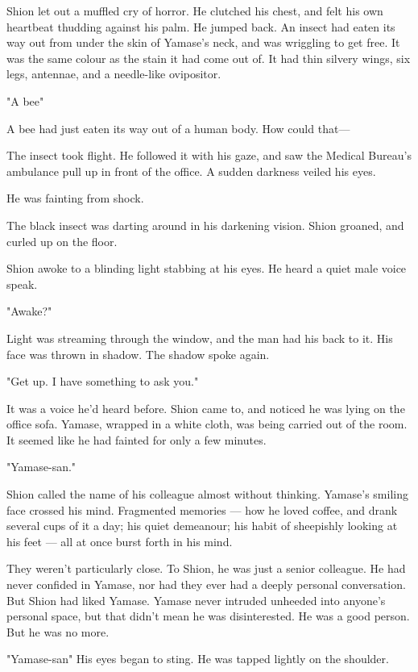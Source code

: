 Shion let out a muffled cry of horror. He clutched his chest, and felt
his own heartbeat thudding against his palm. He jumped back. An insect
had eaten its way out from under the skin of Yamase's neck, and was
wriggling to get free. It was the same colour as the stain it had come
out of. It had thin silvery wings, six legs, antennae, and a needle-like
ovipositor.

"A bee\el "

A bee had just eaten its way out of a human body. How could that---

The insect took flight. He followed it with his gaze, and saw the
Medical Bureau's ambulance pull up in front of the office. A sudden
darkness veiled his eyes.

He was fainting from shock.

The black insect was darting around in his darkening vision. Shion
groaned, and curled up on the floor.

\mybreak

Shion awoke to a blinding light stabbing at his eyes. He heard a quiet
male voice speak.

"Awake?"

Light was streaming through the window, and the man had his back to it.
His face was thrown in shadow. The shadow spoke again.

"Get up. I have something to ask you."

It was a voice he'd heard before. Shion came to, and noticed he was
lying on the office sofa. Yamase, wrapped in a white cloth, was being
carried out of the room. It seemed like he had fainted for only a few
minutes.

"Yamase-san."

Shion called the name of his colleague almost without thinking. Yamase's
smiling face crossed his mind. Fragmented memories --- how he loved
coffee, and drank several cups of it a day; his quiet demeanour; his
habit of sheepishly looking at his feet --- all at once burst forth in his
mind.

They weren't particularly close. To Shion, he was just a senior
colleague. He had never confided in Yamase, nor had they ever had a
deeply personal conversation. But Shion had liked Yamase. Yamase never
intruded unheeded into anyone's personal space, but that didn't mean he
was disinterested. He was a good person. But he was no more.

"Yamase-san\el " His eyes began to sting. He was tapped lightly on the
shoulder.

